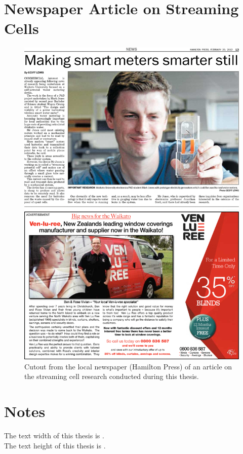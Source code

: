   \chapter*{Newspaper Article on Streaming Cells}
  \begin{figure}
      \centering
      \includegraphics[width=\textwidth]{content/appendices/Article}
      \caption{Cutout from the local newspaper (Hamilton Press) of an article on the streaming cell research conducted during this thesis.}
  \end{figure}

\chapter*{Notes}
The text width of this thesis is \the\textwidth.\\
The text height of this thesis is \the\textheight.





